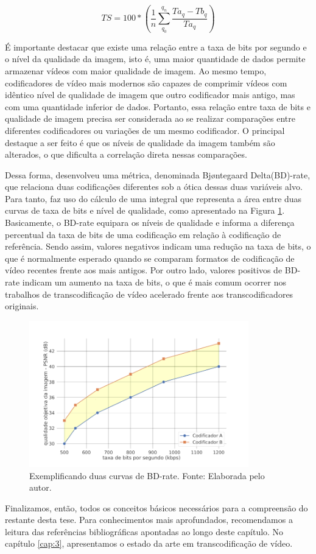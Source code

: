 \begin{equation}
    \label{eq:7}
    TS = 100 * \left ( \frac{1}{n} \sum_{q_0}^{q_n} \frac{Ta_q - Tb_q}{Ta_q} \right )
\end{equation}

É importante destacar que existe uma relação entre a taxa de bits por segundo e o nível da qualidade da imagem, isto é, uma maior quantidade de dados permite armazenar vídeos com maior qualidade de imagem. Ao mesmo tempo, codificadores de vídeo mais modernos são capazes de comprimir vídeos com idêntico nível de qualidade de imagem que outro codificador mais antigo, mas com uma quantidade inferior de dados. Portanto, essa relação entre taxa de bits e qualidade de imagem precisa ser considerada ao se realizar comparações entre diferentes codificadores ou variações de um mesmo codificador. O principal destaque a ser feito é que os níveis de qualidade da imagem também são alterados, o que dificulta a correlação direta nessas comparações.

Dessa forma, \citet{bib:bdrate} desenvolveu uma métrica, denominada Bj{\o}ntegaard Delta(BD)-rate, que relaciona duas codificações diferentes sob a ótica dessas duas variáveis alvo. Para tanto, faz uso do cálculo de uma integral que representa a área entre duas curvas de taxa de bits e nível de qualidade, como apresentado na Figura \ref{fig:9}. Basicamente, o BD-rate equipara os níveis de qualidade e informa a diferença percentual da taxa de bits de uma codificação em relação à codificação de referência. Sendo assim, valores negativos indicam uma redução na taxa de bits, o que é normalmente esperado quando se comparam formatos de codificação de vídeo recentes frente aos mais antigos. Por outro lado, valores positivos de BD-rate indicam um aumento na taxa de bits, o que é mais comum ocorrer nos trabalhos de transcodificação de vídeo acelerado frente aos transcodificadores originais.

\begin{figure}
    \centering
    \includegraphics[width=0.85\textwidth]{FIGURES/fig_9.png}
    \caption{Exemplificando duas curvas de BD-rate. Fonte: Elaborada pelo autor.}
    \label{fig:9}
\end{figure}

Finalizamos, então, todos os conceitos básicos necessários para a compreensão do restante desta tese. Para conhecimentos mais aprofundados, recomendamos a leitura das referências bibliográficas apontadas ao longo deste capítulo. No capítulo \ref{cap:3}, apresentamos o estado da arte em transcodificação de vídeo.
